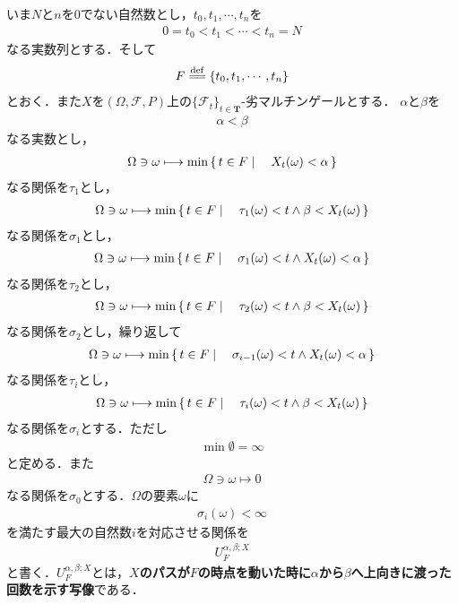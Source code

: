 	いま$N$と$n$を$0$でない自然数とし，$t_0,t_1,\cdots,t_n$を
	\begin{align}
		0 = t_0 < t_1 < \cdots < t_n = N
	\end{align}
	なる実数列とする．そして
	\begin{align}
		F \defeq \{t_0,t_1,\cdots,t_n\}
	\end{align}
	とおく．また$X$を$(\Omega,\mathscr{F},P)$上の$\{\mathscr{F}_t\}_{t \in \mathbf{T}}$-劣マルチンゲールとする．
	$\alpha$と$\beta$を
	\begin{align}
		\alpha < \beta
	\end{align}
	なる実数とし，
	\begin{align}
		\Omega \ni \omega \longmapsto \min{}{\left\{\, t \in F \mid \quad X_t(\omega) < \alpha\, \right\}}
	\end{align}
	なる関係を$\tau_1$とし，
	\begin{align}
		\Omega \ni \omega \longmapsto \min{}{\left\{\, t \in F \mid \quad \tau_1(\omega) < t \wedge \beta < X_t(\omega)\, \right\}}
	\end{align}
	なる関係を$\sigma_1$とし，
	\begin{align}
		\Omega \ni \omega \longmapsto \min{}{\left\{\, t \in F \mid \quad \sigma_1(\omega) < t \wedge X_t(\omega) < \alpha\, \right\}}
	\end{align}
	なる関係を$\tau_2$とし，
	\begin{align}
		\Omega \ni \omega \longmapsto \min{}{\left\{\, t \in F \mid \quad \tau_2(\omega) < t \wedge \beta < X_t(\omega)\, \right\}}
	\end{align}
	なる関係を$\sigma_2$とし，繰り返して
	\begin{align}
		\Omega \ni \omega \longmapsto \min{}{\left\{\, t \in F \mid \quad \sigma_{i-1}(\omega) < t \wedge X_t(\omega) < \alpha\, \right\}}
	\end{align}
	なる関係を$\tau_i$とし，
	\begin{align}
		\Omega \ni \omega \longmapsto \min{}{\left\{\, t \in F \mid \quad \tau_i(\omega) < t \wedge \beta < X_t(\omega)\, \right\}}
	\end{align}
	なる関係を$\sigma_i$とする．ただし
	\begin{align}
		\min{}{\emptyset} = \infty
	\end{align}
	と定める．また
	\begin{align}
		\Omega \ni \omega \longmapsto 0
	\end{align}
	なる関係を$\sigma_0$とする．$\Omega$の要素$\omega$に
	\begin{align}
		\sigma_i(\omega) < \infty
	\end{align}
	を満たす最大の自然数$i$を対応させる関係を
	\begin{align}
		U_F^{\alpha,\beta;X}
	\end{align}
	と書く．$U_F^{\alpha,\beta;X}$とは，{\bf $X$のパスが$F$の時点を動いた時に$\alpha$から$\beta$へ上向きに渡った回数を示す写像}である．
	